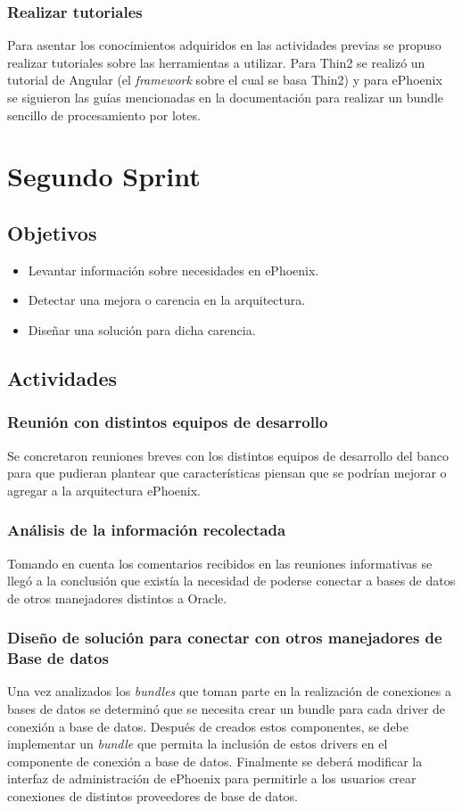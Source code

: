 \subsubsection{Realizar tutoriales}
Para asentar los conocimientos adquiridos en las actividades previas se propuso
realizar tutoriales sobre las herramientas a utilizar. Para Thin2 se realizó un
tutorial de Angular (el \emph{framework} sobre el cual se basa Thin2) y para ePhoenix
se siguieron las guías mencionadas en la documentación para realizar un bundle sencillo
de procesamiento por lotes.

\section{Segundo Sprint}

\subsection{Objetivos}
\begin{itemize}
  \item Levantar información sobre necesidades en ePhoenix.
  \item Detectar una mejora o carencia en la arquitectura.
  \item Diseñar una solución para dicha carencia.
\end{itemize}
\subsection{Actividades}
\subsubsection{Reunión con distintos equipos de desarrollo}
Se concretaron reuniones breves con los distintos equipos de desarrollo del banco
para que pudieran plantear que características piensan que se podrían mejorar o agregar a la
arquitectura ePhoenix.
\subsubsection{Análisis de la información recolectada}
Tomando en cuenta los comentarios recibidos en las reuniones informativas se llegó
a la conclusión que existía la necesidad de poderse conectar a bases de datos de otros
manejadores distintos a Oracle.
\subsubsection{Diseño de solución para conectar con otros manejadores de Base de datos}
Una vez analizados los \emph{bundles} que toman parte en la realización de conexiones a bases
de datos se determinó que se necesita crear un bundle para cada driver de conexión a base de
datos. Después de creados estos componentes, se debe implementar un \emph{bundle} que permita
la inclusión de estos drivers en el componente de conexión a base de datos. Finalmente se deberá
modificar la interfaz de administración de ePhoenix para permitirle a los usuarios
crear conexiones de distintos proveedores de base de datos.

